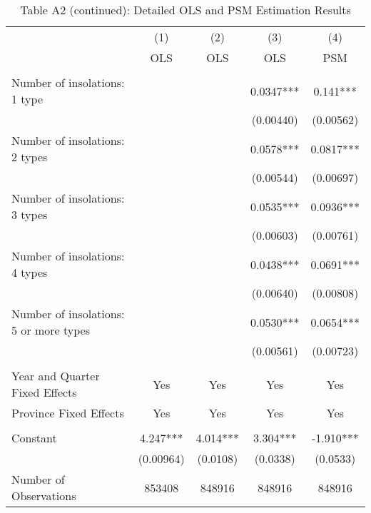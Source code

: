 \documentclass[12pt]{article}
\begin{document}
\begin{table}[H]
\scriptsize
  \centering
  \caption*{Table A2 (continued): Detailed OLS and PSM Estimation Results}
      \begin{tabular}{lcccc}
\hline
                &\multicolumn{1}{c}{(1)}&\multicolumn{1}{c}{(2)}&\multicolumn{1}{c}{(3)}&\multicolumn{1}{c}{(4)}\\
& OLS                      & OLS & OLS & PSM \\
\hline
&&&&\\
Number of insolations: 1 type                          &            &             & 0.0347***   & 0.141***     \\
                                &            &             & (0.00440)   & (0.00562)    \\
Number of insolations: 2 types                         &            &             & 0.0578***   & 0.0817***    \\
                                &            &             & (0.00544)   & (0.00697)    \\
Number of insolations: 3 types                         &            &             & 0.0535***   & 0.0936***    \\
                                &            &             & (0.00603)   & (0.00761)    \\
Number of insolations: 4 types                         &            &             & 0.0438***   & 0.0691***    \\
                                &            &             & (0.00640)   & (0.00808)    \\
Number of insolations: 5 or more types                 &            &             & 0.0530***   & 0.0654***    \\
                                &            &             & (0.00561)   & (0.00723)    \\
&&&&\\
Year and Quarter Fixed Effects&Yes	& Yes &	Yes & Yes\\
Province Fixed Effects&Yes	& Yes &	Yes & Yes\\

&&&&\\

Constant                          & 4.247***   & 4.014***    & 3.304***    & -1.910***    \\
                                & (0.00964)  & (0.0108)    & (0.0338)    & (0.0533)     \\
Number of Observations                               & 853408     & 848916      & 848916      & 848916  \\    



\end{tabular}
\end{table}
\end{document}
